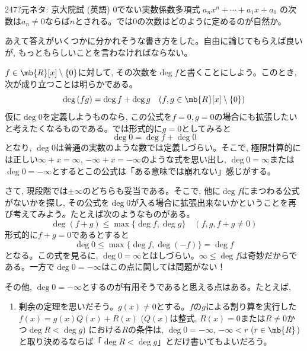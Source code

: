 \begin{prob}{247}{\hosi ?}{元ネタ: 京大院試 (英語)}
 0でない実数係数多項式 $a_nx^n+\cdots +a_1x+a_0$ の次数は$a_n\neq 0$ならば$n$とされる。では0の次数はどのように定めるのが自然か。
\end{prob}
あえて答えがいくつかに分かれそうな書き方をした。自由に論じてもらえば良いが, もっともらしいことを言わなければならない。\par
$f\in \mb{R}[x]\setminus{\{ 0 \}}$に対して, その次数を$\deg{f}$と書くことにしよう。このとき, 次が成り立つことは明らかである。
\[\deg{(fg)} = \deg{f} + \deg{g}\quad (f,g\in \mb{R}[x]\setminus{\{ 0 \}})\]
仮に$\deg{0}$を定義しようものなら, この公式を$f=0, g=0$の場合にも拡張したいと考えたくなるものである。では形式的に$g=0$としてみると
\[\deg{0} = \deg{f} + \deg{0}\]
となり, $\deg{0}$は普通の実数のような数では定義しづらい。そこで, 極限計算的には正しい$\infty + x = \infty$, $-\infty + x = -\infty$のような式を思い出し, $\deg{0} = \infty$または$\deg{0} = -\infty$とするとこの公式は「ある意味では崩れない」感じがする。\par 
さて, 現段階では$\pm \infty$のどちらも妥当である。そこで, 他に$\deg{f}$にまつわる公式がないかを探し, その公式を$\deg{0}$が入る場合に拡張出来ないかということを再び考えてみよう。たとえば次のようなものがある。
\[\deg{(f+g)} \leq  \max{\{ \deg{f}, \deg{g}\} } \quad (f,g,f+g\neq 0)\]
形式的に$f+g = 0$であるとすると
\[\deg{0} \leq \max{\{ \deg{f}, \deg{(-f)}\} } = \deg{f}\]
となる。この式を見るに, $\deg{0} = \infty$とはしづらい。$\infty \leq \deg{f}$は奇妙だからである。一方で$\deg{0} = -\infty$はこの点に関しては問題がない！\par 
その他, $\deg{0} = -\infty$とするのが有用そうであると思える点はある。たとえば, 
\begin{enumerate}
 \item 剰余の定理を思いだそう。$g(x)\neq 0$とする。$f$の$g$による割り算を実行した$f(x) = g(x)Q(x) + R(x)$ ($Q(x)$は整式, $R(x) = 0$または$R\neq 0$かつ$\deg{R} < \deg{g}$) における$R$の条件は, $\deg{0} = -\infty$, $-\infty < r$ ($r\in \mb{R}$)と取り決めるならば「$\deg{R} < \deg{g}$」とだけ書いてもよいだろう。  
\end{enumerate}

